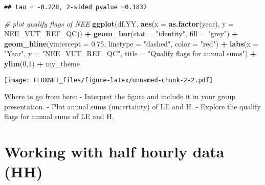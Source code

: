 \documentclass[
]{article}
\newenvironment{Shaded}{\begin{snugshade}}{\end{snugshade}}
\newcommand{\AttributeTok}[1]{\textcolor[rgb]{0.13,0.29,0.53}{#1}}
\newcommand{\CommentTok}[1]{\textcolor[rgb]{0.56,0.35,0.01}{\textit{#1}}}
\newcommand{\DecValTok}[1]{\textcolor[rgb]{0.00,0.00,0.81}{#1}}
\newcommand{\FloatTok}[1]{\textcolor[rgb]{0.00,0.00,0.81}{#1}}
\newcommand{\FunctionTok}[1]{\textcolor[rgb]{0.13,0.29,0.53}{\textbf{#1}}}
\newcommand{\NormalTok}[1]{#1}
\newcommand{\SpecialCharTok}[1]{\textcolor[rgb]{0.81,0.36,0.00}{\textbf{#1}}}
\newcommand{\StringTok}[1]{\textcolor[rgb]{0.31,0.60,0.02}{#1}}
\begin{document}
\begin{Shaded}
\end{Shaded}

\begin{verbatim}
## tau = -0.228, 2-sided pvalue =0.1837
\end{verbatim}

\begin{Shaded}
\begin{Highlighting}[]
\CommentTok{\# plot qualify flags of NEE}
\FunctionTok{ggplot}\NormalTok{(df.YY, }\FunctionTok{aes}\NormalTok{(}\AttributeTok{x =} \FunctionTok{as.factor}\NormalTok{(year), }\AttributeTok{y =}\NormalTok{ NEE\_VUT\_REF\_QC)) }\SpecialCharTok{+}
  \FunctionTok{geom\_bar}\NormalTok{(}\AttributeTok{stat =} \StringTok{"identity"}\NormalTok{, }\AttributeTok{fill =} \StringTok{"grey"}\NormalTok{) }\SpecialCharTok{+}
  \FunctionTok{geom\_hline}\NormalTok{(}\AttributeTok{yintercept =} \FloatTok{0.75}\NormalTok{, }\AttributeTok{linetype =} \StringTok{"dashed"}\NormalTok{, }\AttributeTok{color =} \StringTok{"red"}\NormalTok{) }\SpecialCharTok{+}
  \FunctionTok{labs}\NormalTok{(}\AttributeTok{x =} \StringTok{"Year"}\NormalTok{, }\AttributeTok{y =} \StringTok{"NEE\_VUT\_REF\_QC"}\NormalTok{, }\AttributeTok{title =} \StringTok{"Qualify flags for annual sums"}\NormalTok{) }\SpecialCharTok{+}
  \FunctionTok{ylim}\NormalTok{(}\DecValTok{0}\NormalTok{,}\DecValTok{1}\NormalTok{) }\SpecialCharTok{+}\NormalTok{  my\_theme}
\end{Highlighting}
\end{Shaded}

\texttt{[image: FLUXNET\_files/figure-latex/unnamed-chunk-2-2.pdf]}

Where to go from here: - Interpret the figure and include it in your
group presentation. - Plot annual sums (uncertainty) of LE and H. -
Explore the qualify flags for annual sums of LE and H.

\section{Working with half hourly data
(HH)}\label{working-with-half-hourly-data-hh}
\end{document}

